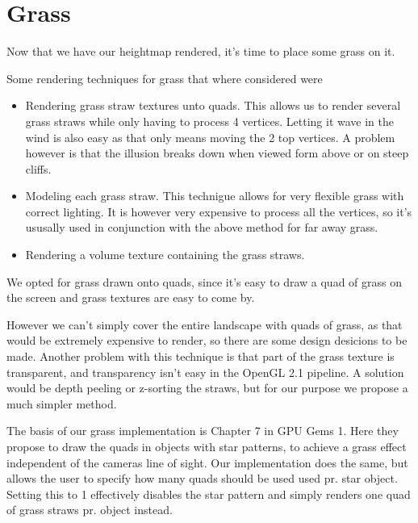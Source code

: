 \chapter{Grass}


Now that we have our heightmap rendered, it's time to place some
grass on it. 

Some rendering techniques for grass that where considered were

\begin{itemize}
\item Rendering grass straw textures unto quads. This allows us to
  render several grass straws while only having to process 4
  vertices. Letting it wave in the wind is also easy as that only
  means moving the 2 top vertices. A problem however is that the
  illusion breaks down when viewed form above or on steep cliffs.
\item Modeling each grass straw. This technigue allows for very
  flexible grass with correct lighting. It is however very expensive
  to process all the vertices, so it's ususally used in conjunction
  with the above method for far away grass.
\item Rendering a volume texture containing the grass straws.
\end{itemize}

We opted for grass drawn onto quads, since it's easy to
draw a quad of grass on the screen and grass textures are easy to come
by. 

However we can't simply cover the entire landscape with quads of
grass, as that would be extremely expensive to render, so there are
some design desicions to be made. Another problem with this technique
is that part of the grass texture is transparent, and transparency
isn't easy in the OpenGL 2.1 pipeline. A solution would be depth
peeling or z-sorting the straws, but for our purpose we propose a much
simpler method.


The basis of our grass implementation is Chapter 7 in GPU Gems 1. Here
they propose to draw the quads in objects with star patterns, to
achieve a grass effect independent of the cameras line of sight. Our
implementation does the same, but allows the user to specify how many
quads should be used used pr. star object. Setting this to 1
effectively disables the star pattern and simply renders one quad of
grass straws pr. object instead.

